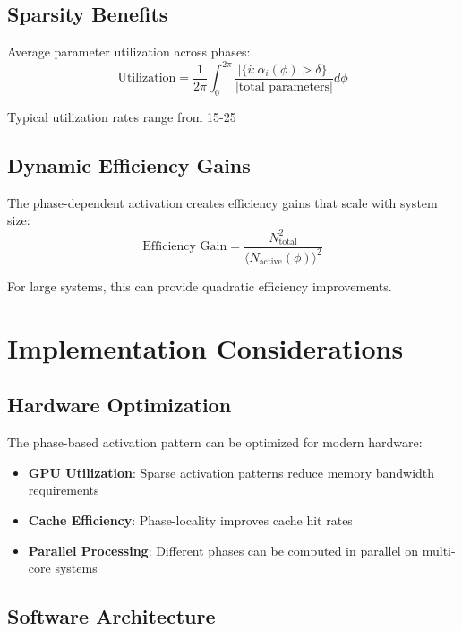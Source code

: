 \subsection{Sparsity Benefits}

Average parameter utilization across phases:
\begin{equation}
\text{Utilization} = \frac{1}{2\pi} \int_0^{2\pi} \frac{|\{i : \alpha_i(\phi) > \delta\}|}{|\text{total parameters}|} d\phi
\end{equation}

Typical utilization rates range from 15-25%

\subsection{Dynamic Efficiency Gains}

The phase-dependent activation creates efficiency gains that scale with system size:
\begin{equation}
\text{Efficiency Gain} = \frac{N_{\text{total}}^2}{\langle N_{\text{active}}(\phi) \rangle^2}
\end{equation}

For large systems, this can provide quadratic efficiency improvements.

\section{Implementation Considerations}

\subsection{Hardware Optimization}

The phase-based activation pattern can be optimized for modern hardware:
\begin{itemize}
    \item \textbf{GPU Utilization}: Sparse activation patterns reduce memory bandwidth requirements
    \item \textbf{Cache Efficiency}: Phase-locality improves cache hit rates
    \item \textbf{Parallel Processing}: Different phases can be computed in parallel on multi-core systems
\end{itemize}

\subsection{Software Architecture}

